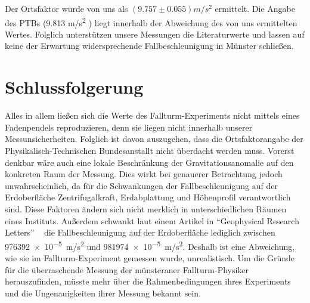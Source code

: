\documentclass[
	a4paper,
	12pt,
	pagesize,
	ngerman
]{scrartcl}
\begin{document}
	
	Der Ortsfaktor wurde von uns als $(9.757 \pm 0.055) \si{m/s^2}$ ermittelt. Die Angabe des PTBs (9.813 \si{m/s^2} ) liegt innerhalb der Abweichung des von uns ermittelten Wertes. Folglich unterstützen unsere Messungen die Literaturwerte und lassen auf keine der Erwartung widersprechende Fallbeschleunigung in Münster schließen.

	\section{Schlussfolgerung}
	Alles in allem ließen sich die Werte des Fallturm-Experiments nicht mittels eines Fadenpendels reproduzieren, denn sie liegen nicht innerhalb unserer Messunsicherheiten. Folglich ist davon auszugehen, dass die Ortsfaktorangabe der Physikalisch-Technischen Bundesanstallt nicht überdacht werden muss. Vorerst denkbar wäre auch eine lokale Beschränkung der Gravitationsanomalie auf den konkreten Raum der Messung. Dies wirkt bei genauerer Betrachtung jedoch unwahrscheinlich, da für die Schwankungen der Fallbeschleunigung auf der Erdoberfläche Zentrifugalkraft, Erdabplattung und Höhenprofil verantwortlich sind. Diese Faktoren ändern sich nicht merklich in unterschiedlichen Räumen eines Instituts. Außerdem schwankt laut einem Artikel in \enquote{Geophysical Research Letters} ~\cite[Abs. 12]{Fall} die Fallbeschleunigung auf der Erdoberfläche lediglich zwischen \SI{976392e-5}{m/s^2} und \SI{981974e-5}{m/s^2}. %
	 Deshalb ist eine Abweichung, wie sie im Fallturm-Experiment gemessen wurde, unrealistisch.  Um die Gründe für die überraschende Messung der münsteraner Fallturm-Physiker herauszufinden, müsste mehr über die Rahmenbedingungen ihres Experiments und die Ungenauigkeiten ihrer Messung bekannt sein.



	\printbibliography
\end{document}
